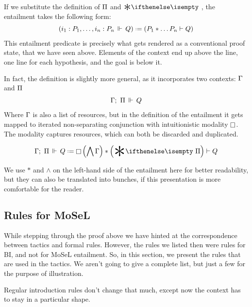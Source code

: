 If we substitute the definition of \(\Pi\) and \(\Sep\), the entailment takes the following form:
\[\left( \entailsOne {i_1 : P_1, \ldots , i_n : P_n} Q \right) \defeq
  \left( P_1 * \ldots P_n \vdash Q \right)\]
This entailment predicate is precisely what gets rendered as a conventional proof state, that we have seen above.
Elements of the context end up above the line, one line for each hypothesis, and the goal is below it.

In fact, the definition is slightly more general, as it incorporates two contexts: \(\Gamma\) and \(\Pi\)
\[\Gamma ;\,\, \Pi \,\Vdash\, Q\]
Where \(\Gamma\) is also a list of resources, but in the definition of the entailment it gets mapped to iterated non-separating conjunction with intuitionistic modality \(\mathop{\Box}\).
The modality captures resources, which can both be discarded and duplicated.

\[\entailsD Q \defeq \intuit \left(\bigwedge \IntuD\right) * \left(\Sep \SpatD\right) \vdash Q\]

We use \(\ast\) and \(\wedge\) on the left-hand side of the entailment here for better readability, but they can also be translated into bunches, if this presentation is more comfortable for the reader.

\subsection{Rules for MoSeL}
\label{sec:rules-regular-ipm}

While stepping through the proof above we have hinted at the correspondence between tactics and formal rules.
However, the rules we listed then were rules for BI, and not for MoSeL entailment.
So, in this section, we present the rules that are used in the tactics.
We aren't going to give a complete list, but just a few for the purpose of illustration.

Regular introduction rules don't change that much, except now the context has to stay in a particular shape.

